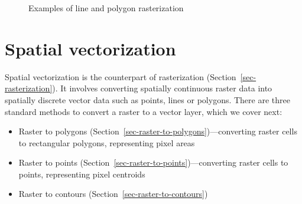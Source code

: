 \documentclass[
  letterpaper,
]{krantz}
\providecommand{\tightlist}{%
  \setlength{\itemsep}{0pt}\setlength{\parskip}{0pt}}\usepackage{longtable,booktabs,array}
\begin{document}
\begin{figure}

\begin{minipage}{0.50\linewidth}



\end{minipage}%
%
\begin{minipage}{0.50\linewidth}



\end{minipage}%

\caption{\label{fig-rasterize-lines-polygons}Examples of line and
polygon rasterization}

\end{figure}%

\section{Spatial vectorization}\label{sec-spatial-vectorization}

Spatial vectorization is the counterpart of rasterization
(Section~\ref{sec-rasterization}). It involves converting spatially
continuous raster data into spatially discrete vector data such as
points, lines or polygons. There are three standard methods to convert a
raster to a vector layer, which we cover next:

\begin{itemize}
\tightlist
\item
  Raster to polygons (Section~\ref{sec-raster-to-polygons})---converting
  raster cells to rectangular polygons, representing pixel areas
\item
  Raster to points (Section~\ref{sec-raster-to-points})---converting
  raster cells to points, representing pixel centroids
\item
  Raster to contours (Section~\ref{sec-raster-to-contours})
\end{itemize}
\end{document}
